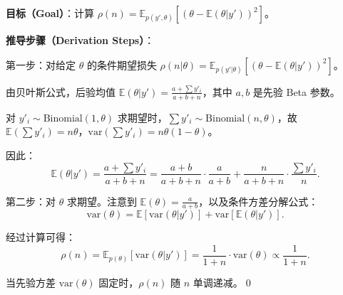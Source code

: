 \textbf{目标（Goal）}：计算 $\rho(n) = \mathbb{E}_{p(y', \theta)}[(\theta - \mathbb{E}(\theta | y'))^2]$。

\textbf{推导步骤（Derivation Steps）}：

第一步：对给定 $\theta$ 的条件期望损失 $\rho(n | \theta) = \mathbb{E}_{p(y'|\theta)}[(\theta - \mathbb{E}(\theta | y'))^2]$。

由贝叶斯公式，后验均值 $\mathbb{E}(\theta | y') = \frac{a + \sum y'_i}{a + b + n}$，其中 $a, b$ 是先验 Beta 参数。

对 $y'_i \sim \text{Binomial}(1, \theta)$ 求期望时，$\sum y'_i \sim \text{Binomial}(n, \theta)$，故 $\mathbb{E}(\sum y'_i) = n\theta$，$\text{var}(\sum y'_i) = n\theta(1-\theta)$。

因此：
\[
\mathbb{E}(\theta | y') = \frac{a + \sum y'_i}{a + b + n}
= \frac{a + b}{a + b + n} \cdot \frac{a}{a+b} + \frac{n}{a + b + n} \cdot \frac{\sum y'_i}{n}.
\]

第二步：对 $\theta$ 求期望。注意到 $\mathbb{E}(\theta) = \frac{a}{a+b}$，以及条件方差分解公式：
\[
\text{var}(\theta) = \mathbb{E}[\text{var}(\theta | y')] + \text{var}[\mathbb{E}(\theta | y')].
\]

经过计算可得：
\[
\rho(n) = \mathbb{E}_{p(\theta)}[\text{var}(\theta | y')]
= \frac{1}{1 + n} \cdot \text{var}(\theta)
\propto \frac{1}{1 + n}.
\]

当先验方差 $\text{var}(\theta)$ 固定时，$\rho(n)$ 随 $n$ 单调递减。\qed

\endinput
